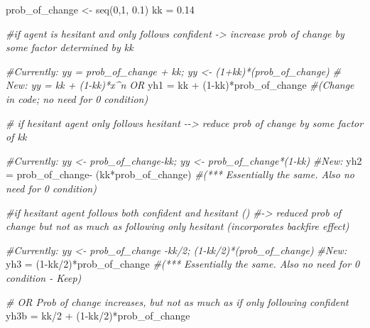 \documentclass[
]{article}
\newenvironment{Shaded}{\begin{snugshade}}{\end{snugshade}}
\newcommand{\CommentTok}[1]{\textcolor[rgb]{0.56,0.35,0.01}{\textit{#1}}}
\newcommand{\DecValTok}[1]{\textcolor[rgb]{0.00,0.00,0.81}{#1}}
\newcommand{\FloatTok}[1]{\textcolor[rgb]{0.00,0.00,0.81}{#1}}
\newcommand{\FunctionTok}[1]{\textcolor[rgb]{0.00,0.00,0.00}{#1}}
\newcommand{\NormalTok}[1]{#1}
\newcommand{\OtherTok}[1]{\textcolor[rgb]{0.56,0.35,0.01}{#1}}
\newcommand{\SpecialCharTok}[1]{\textcolor[rgb]{0.00,0.00,0.00}{#1}}
\begin{document}
\begin{Shaded}
\begin{Highlighting}[]
\NormalTok{prob\_of\_change }\OtherTok{\textless{}{-}} \FunctionTok{seq}\NormalTok{(}\DecValTok{0}\NormalTok{,}\DecValTok{1}\NormalTok{, }\FloatTok{0.1}\NormalTok{)}
\NormalTok{kk }\OtherTok{=} \FloatTok{0.14}

\CommentTok{\#if agent is hesitant and only follows confident {-}\textgreater{} increase prob of change by some factor determined by kk}

\CommentTok{\#Currently: yy = prob\_of\_change + kk;  yy \textless{}{-} (1+kk)*(prob\_of\_change)}
\CommentTok{\# New: yy = kk + (1{-}kk)*x\^{}n OR}
\NormalTok{yh1 }\OtherTok{=}\NormalTok{ kk }\SpecialCharTok{+}\NormalTok{ (}\DecValTok{1}\SpecialCharTok{{-}}\NormalTok{kk)}\SpecialCharTok{*}\NormalTok{prob\_of\_change }\CommentTok{\#(Change in code; no need for 0 condition)}

\CommentTok{\# if hesitant agent only follows hesitant {-}{-}\textgreater{} reduce prob of change by some factor of kk}

\CommentTok{\#Currently: yy \textless{}{-} prob\_of\_change{-}kk; yy \textless{}{-} prob\_of\_change*(1{-}kk)}
\CommentTok{\#New:}
\NormalTok{yh2 }\OtherTok{=}\NormalTok{ prob\_of\_change}\SpecialCharTok{{-}}\NormalTok{ (kk}\SpecialCharTok{*}\NormalTok{prob\_of\_change) }\CommentTok{\#(*** Essentially the same. Also no need for 0 condition)}


\CommentTok{\#if hesitant agent follows both confident and hesitant ()}
  \CommentTok{\#{-}\textgreater{} reduced prob of change but not as much as following only hesitant (incorporates backfire effect)}

\CommentTok{\#Currently: yy \textless{}{-} prob\_of\_change {-}kk/2; (1{-}kk/2)*(prob\_of\_change)}
\CommentTok{\#New:}
\NormalTok{yh3 }\OtherTok{=}\NormalTok{ (}\DecValTok{1}\SpecialCharTok{{-}}\NormalTok{kk}\SpecialCharTok{/}\DecValTok{2}\NormalTok{)}\SpecialCharTok{*}\NormalTok{prob\_of\_change }\CommentTok{\#(*** Essentially the same. Also no need for 0 condition {-} Keep)}

  \CommentTok{\# OR Prob of change increases, but not as much as if only following confident}
\NormalTok{yh3b }\OtherTok{=}\NormalTok{ kk}\SpecialCharTok{/}\DecValTok{2} \SpecialCharTok{+}\NormalTok{ (}\DecValTok{1}\SpecialCharTok{{-}}\NormalTok{kk}\SpecialCharTok{/}\DecValTok{2}\NormalTok{)}\SpecialCharTok{*}\NormalTok{prob\_of\_change}


\end{Highlighting}
\end{Shaded}
\end{document}
